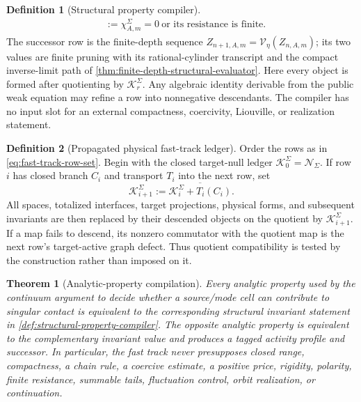 \documentclass[11pt]{article}
\numberwithin{section}{part}
\theoremstyle{plain}
\newtheorem{theorem}{Theorem}[section]
\theoremstyle{definition}
\newtheorem{definition}[definition]{Definition}
\theoremstyle{remark}
\newcommand{\Null}{\mathscr N}
\begin{document}
\begin{definition}[Structural property compiler]
\begin{align}
   &:=\chi_{A,m}^{\Sigma}=0\ \text{or its resistance is finite}.
   \label{eq:property-compiler-fluct}
\end{align}
The successor row is the finite-depth sequence
\(Z_{n+1,A,m}=\mathcal V_\eta(Z_{n,A,m})\); its two values are finite
pruning with its rational-cylinder transcript and the compact inverse-limit
path of \cref{thm:finite-depth-structural-evaluator}.
Here every object is formed after quotienting by \(\mathcal K_r^\Sigma\).
Any algebraic identity derivable from the public weak equation may refine a
row into nonnegative descendants.  The compiler has no input slot for an external
compactness, coercivity, Liouville, or realization statement.
\end{definition}

\begin{definition}[Propagated physical fast-track ledger]
\label{def:propagated-physical-fast-track-ledger}
Order the rows as in \eqref{eq:fast-track-row-set}.  Begin with the closed
target-null ledger \(\mathcal K_0^\Sigma=\Null_\Sigma\).  If row \(i\) has
closed branch \(C_i\) and transport \(T_i\) into the next row, set
\begin{equation}
 \label{eq:propagated-physical-ledger}
 \mathcal K_{i+1}^\Sigma
 :=\overline{\mathcal K_i^\Sigma+T_i(C_i)}.
\end{equation}
All spaces, totalized interfaces, target projections, physical forms, and
subsequent invariants are then replaced by their descended objects on the
quotient by \(\mathcal K_{i+1}^\Sigma\).  If a map fails to descend, its
nonzero commutator with the quotient map is the next row's target-active
graph defect.  Thus quotient compatibility is tested by the construction
rather than imposed on it.
\end{definition}

\begin{theorem}[Analytic-property compilation]
\label{thm:analytic-property-compilation}
Every analytic property used by the continuum argument to decide whether a
source/mode cell can contribute to singular contact is equivalent to the
corresponding structural invariant statement in
\cref{def:structural-property-compiler}.  The opposite analytic property is
equivalent to the complementary invariant value and produces a tagged
activity profile and successor.  In particular, the fast track never presupposes closed
range, compactness, a chain rule, a coercive estimate, a positive price,
rigidity, polarity, finite resistance, summable tails, fluctuation control,
orbit realization, or continuation.
\end{theorem}
\end{document}
